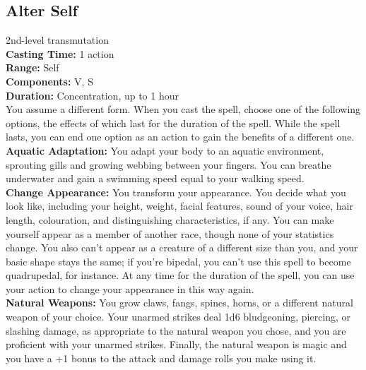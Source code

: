 \documentclass[11pt, A4paper, english]{article}
\begin{document}
		\subsection{Alter Self}
2nd-level transmutation \\
\textbf{Casting Time:} 1 action \\
\textbf{Range:} Self \\
\textbf{Components:} V, S \\
\textbf{Duration:} Concentration, up to 1 hour \\
You assume a different form. When you cast the spell, choose one of the following options, the effects of which last for the duration of the spell. While the spell lasts, you can end one option as an action to gain the benefits of a different one. \\
\textbf{Aquatic Adaptation:} You adapt your body to an aquatic environment, sprouting gills and growing webbing between your fingers. You can breathe underwater and gain a swimming speed equal to your walking speed. \\
\textbf{Change Appearance:} You transform your appearance. You decide what you look like, including your height, weight, facial features, sound of your voice, hair length, colouration, and distinguishing characteristics, if any. You can make yourself appear as a member of another race, though none of your statistics change. You also can’t appear as a creature of a different size than you, and your basic shape stays the same; if you're bipedal, you can’t use this spell to become quadrupedal, for instance. At any time for the duration of the spell, you
can use your action to change your appearance in this way again. \\
\textbf{Natural Weapons:} You grow claws, fangs, spines, horns, or a different natural weapon of your choice. Your unarmed strikes deal 1d6 bludgeoning, piercing, or slashing damage, as appropriate to the natural weapon you chose, and you are proficient with your unarmed strikes. Finally, the natural weapon is magic and you have a +1 bonus to the attack and damage rolls you make using it.
\end{document}
